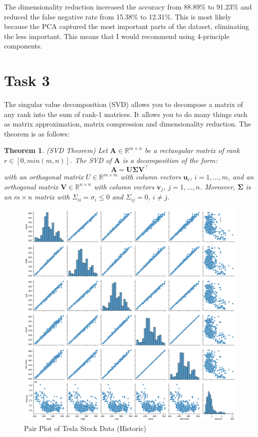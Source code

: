 \documentclass{article}
\newcommand{\matrx}[1]{\bm{#1}}
\newcommand{\vectr}[1]{\textbf{#1}}
\newcommand{\real}{\mathbb{R}}
\newtheorem{theorem}{Theorem}[section]
\begin{document}
	The dimensionality reduction increased the accuracy from 88.89\% to 91.23\% and reduced the false negative rate from 15.38\% to 12.31\%. This is most likely because the PCA captured the most important parts of the dataset, eliminating the less important. This means that I would recommend using 4-principle components. 
	
	\section{Task 3}
	The singular value decomposition (SVD) allows you to decompose a matrix of any rank into the sum of rank-1 matrices. It allows you to do many things such as matrix approximation, matrix compression and dimensionality reduction.  The theorem is as follows:
	
	\begin{theorem}(SVD Theorem) 
		\normalfont Let $ \matrx{A} \in \real^{m \times n} $ be a rectangular matrix of rank $ r \in [0, min(m, n)] $. The SVD of $ \matrx{A} $ is a decomposition of the form:
		$$ \matrx{A} = \matrx{U} \matrx{\Sigma} \matrx{V}^{\top} $$
		with an orthogonal matrix $ U \in \real^{m \times m} $ with column vectors $ \vectr{u}_i $, $ i = 1, \ldots, m $, and an orthogonal matrix $ \matrx{V} \in \real^{n \times n} $ with column vectors $ \vectr{v}_j $, $ j = 1, \ldots, n $. Moreover, $ \matrx{\Sigma} $ is an $ m \times n $ matrix with $ \Sigma_{ii} = \sigma_i \leq 0 $ and $ \Sigma_{ij} = 0 $, $ i \ne j $. 
	\end{theorem}

	\begin{figure}
		\centering
		\includegraphics*[scale = 0.3]{task_3_pairplot.png}
		\caption{Pair Plot of Tesla Stock Data (Historic)}
		\label{fig:task_3_pairplot}
	\end{figure}
\end{document}
